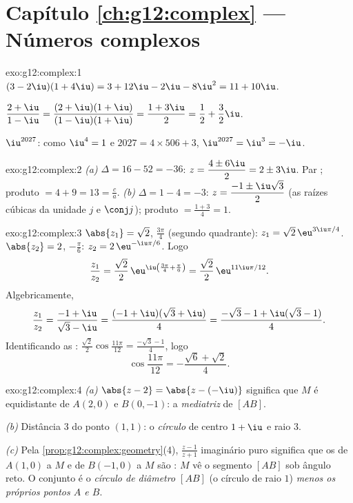 \section*{Capítulo \ref{ch:g12:complex} --- Números complexos}

\begin{solution}{exo:g12:complex:1}
$(3-2\iu)(1+4\iu) = 3 + 12\iu - 2\iu - 8\iu^2 = 11 + 10\iu$.

$\dfrac{2+\iu}{1-\iu} = \dfrac{(2+\iu)(1+\iu)}{(1-\iu)(1+\iu)}
= \dfrac{1 + 3\iu}{2} = \dfrac12 + \dfrac32\iu$.

$\iu^{2027}$: como $\iu^4 = 1$ e $2027 = 4 \times 506 + 3$,
$\iu^{2027} = \iu^3 = -\iu$.
\end{solution}

\begin{solution}{exo:g12:complex:2}
\emph{(a)} $\Delta = 16 - 52 = -36$:
$z = \dfrac{4 \pm 6\iu}{2} = 2 \pm 3\iu$. Par ; produto
$= 4 + 9 = 13 = \frac ca$. \emph{(b)} $\Delta = 1 - 4 = -3$:
$z = \dfrac{-1 \pm \iu\sqrt3}{2}$ (as raízes cúbicas da unidade $j$ e
$\conj j$); produto $= \frac{1 + 3}{4} = 1$.
\end{solution}

\begin{solution}{exo:g12:complex:3}
$\abs{z_1} = \sqrt2$,  $\frac{3\pi}{4}$ (segundo quadrante):
$z_1 = \sqrt2\,\eu^{3\iu\pi/4}$. $\abs{z_2} = 2$, 
$-\frac\pi6$: $z_2 = 2\,\eu^{-\iu\pi/6}$. Logo
\[
\frac{z_1}{z_2} = \frac{\sqrt2}{2}\,\eu^{\iu\left(\frac{3\pi}{4} + \frac{\pi}{6}\right)}
= \frac{\sqrt2}{2}\,\eu^{11\iu\pi/12}.
\]
Algebricamente,
\[
\frac{z_1}{z_2} = \frac{-1+\iu}{\sqrt3 - \iu}
= \frac{(-1+\iu)(\sqrt3+\iu)}{4}
= \frac{-\sqrt3 - 1 + \iu(\sqrt3 - 1)}{4}.
\]
Identificando as :
$\frac{\sqrt2}{2}\cos\frac{11\pi}{12} = \frac{-\sqrt3-1}{4}$, logo
\[
\cos\frac{11\pi}{12} = -\frac{\sqrt6 + \sqrt2}{4}.
\]
\end{solution}

\begin{solution}{exo:g12:complex:4}
\emph{(a)} $\abs{z - 2} = \abs{z - (-\iu)}$ significa que $M$ é
equidistante de $A(2, 0)$ e $B(0, -1)$: a \emph{mediatriz} de $[AB]$.

\emph{(b)} Distância $3$ do ponto $(1,1)$: o \emph{círculo} de centro
$1 + \iu$ e raio $3$.

\emph{(c)} Pela \cref{prop:g12:complex:geometry}(4),
$\frac{z-1}{z+1}$ imaginário puro significa que os  de $A(1,0)$ a
$M$ e de $B(-1,0)$ a $M$ são : $M$ vê o segmento $[AB]$ sob
ângulo reto. O conjunto é o \emph{círculo de diâmetro $[AB]$} (o círculo
de raio $1$) \emph{menos os próprios pontos $A$ e $B$}.
\end{solution}

